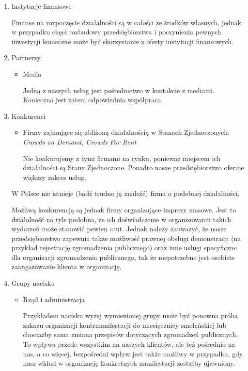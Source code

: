 \documentclass{article}
\begin{document}
\begin{enumerate}
\begin{itemize}
	
	\end{itemize}
\item Instytucje finansowe

Finanse na rozpoczęcie działalności są w całości ze środków własnych, jednak w przypadku chęci rozbudowy przedsiębiorstwa i poczynienia pewnych inwestycji konieczne może być skorzystanie z oferty instytucji finansowych.

\item Partnerzy
	\begin{itemize}
	\item Media
	
	Jedną z naszych usług jest pośrednictwo w kontakcie z mediami. Konieczna jest zatem odpowiednia współpraca.
	
	\end{itemize}

\item Konkurenci
	\begin{itemize}
	\item Firmy zajmujące się zbliżoną działalnością w Stanach Zjednoczonych: \textit{Crowds on Demand, Crowds For Rent}
	
	Nie konkurujemy z tymi firmami na rynku, ponieważ miejscem ich działalności są Stany Zjednoczone. Ponadto nasze przedsiębiorstwo oferuje większy zakres usług.
	
	\end{itemize}
	W Polsce nie istnieje (bądź trudno ją znaleźć) firma o podobnej działalności.
	
	Możliwą konkurencją są jednak firmy organizujące imprezy masowe. Jest to działalność na tyle podobna, że ich doświadczenie w organizowaniu takich wydarzeń może stanowić pewien atut. Jednak należy zauważyć, że nasze przedsiębiorstwo zapewnia także możliwość prawnej obsługi demonstracji (na przykład rejestrację zgromadzenia publicznego) oraz inne usługi specyficzne dla organizacji zgromadzenia publicznego, tak że niepotrzebne jest osobiste zaangażowanie klienta w organizację.
\item Grupy nacisku
	\begin{itemize}
	\item Rząd i administracja
	
	Przykładem nacisku wyżej wymienionej grupy może być ponowna próba zakazu organizacji kontrmanifestacji do miesięcznicy smoleńskiej lub chociażby sama zmiana przepisów dotyczących zgromadzeń publicznych. To wpływa przede wszystkim na naszych klientów, ale też pośrednio na nas, a co więcej, bezpośredni wpływ jest także możliwy w przypadku, gdy nasz wkład w organizację konkretnych manifestacji zostałby ujawniony.


\end{itemize}
\end{enumerate}
\end{document}
